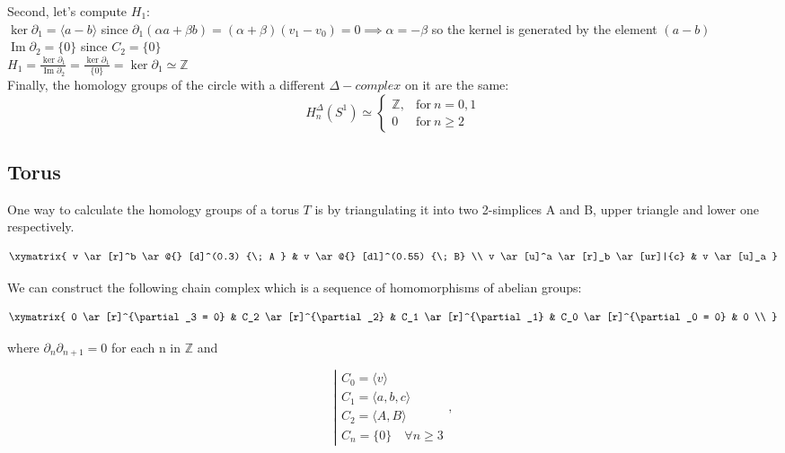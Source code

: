 \documentclass[11pt,a4paper]{report}
\DeclareMathOperator{\Ima}{Im}
\begin{document}
\par
Second, let's compute $H_1$: \\
$\ker\partial_1 = \langle a-b \rangle$ 
		since $\partial_1(\alpha a + \beta b) = (\alpha + \beta)(v_1 - v_0) = 0 \implies \alpha = -\beta$ so the kernel is generated by the element $(a - b)$ \\
$\Ima\partial_2 = \{0\}$ since $C_2 = \{0\}$ \\
$H_1 = \frac{\ker\partial_1}{\Ima\partial_2} = 
		\frac{ \ker{\partial_1} }{ \{0\} } = \ker{\partial_1} \simeq \mathbb{Z}$ \\


Finally, the homology groups of the circle with a different $\Delta- complex$ on it are the same: 
		\[
	  		H_n^\Delta(S^1) \simeq \left\{
			      \begin{array}{rl}
			     \mathbb{Z}, & \textrm{for} \: n = 0, 1\\
			    
                        0 & \textrm{for} \: n \geqslant 2
			      \end{array}
			 \right.
	  	\]


               
		      \subsection{Torus}
      
One way to calculate the homology groups of a torus $T$ is by triangulating it into two 2-simplices A and B, upper triangle and lower one respectively.

	\[
		\xymatrix{
			v  \ar[r]^b \ar @{} [d]^(0.3) {\; A }
			& v \ar @{} [dl]^(0.55) {\; B} \\
			v \ar[u]^a \ar[r]_b \ar[ur]|{c}
			& v \ar[u]_a }
	\]
                                                                       
 We can construct the following chain complex which is a sequence of homomorphisms of abelian groups: 

	\[
		\xymatrix{
			0  \ar[r]^{\partial_3 = 0} & 
			C_2  \ar[r]^{\partial_2} & 
			C_1  \ar[r]^{\partial_1} & 
			C_0  \ar[r]^{\partial_0 = 0}
			& 0 \\ }
	\]

 where \(\partial_n\partial_{n+1}=0\) for each n  in $\mathbb{Z}$ and 
 
			\[
				\left|
				  \begin{array}{l}
				  	C_0= \langle v\rangle \\
				  	C_1=\langle a, b, c \rangle \\
                                C_2=\langle A, B \rangle \\
				      C_n=\{0\} \quad \forall n \geqslant 3 
				  \end{array}
				\right., 
			\]
\end{document}
